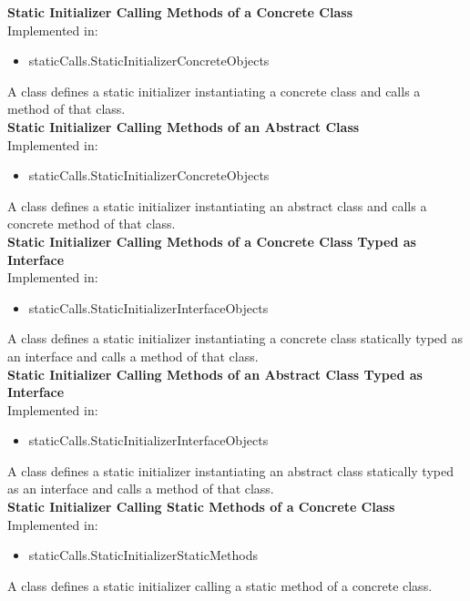 \documentclass{article}
\begin{document}
\noindent
\textbf{Static Initializer Calling Methods of a Concrete Class}\\
Implemented in: 
\begin{itemize}
    \item staticCalls.StaticInitializerConcreteObjects
\end{itemize}
A class defines a static initializer instantiating a concrete class and calls a method of that class.\\

\noindent
\textbf{Static Initializer Calling Methods of an Abstract Class}\\
Implemented in: 
\begin{itemize}
    \item staticCalls.StaticInitializerConcreteObjects
\end{itemize}
A class defines a static initializer instantiating an abstract class and calls a concrete method of that class.\\

\noindent
\textbf{Static Initializer Calling Methods of a Concrete Class Typed as Interface}\\
Implemented in: 
\begin{itemize}
    \item staticCalls.StaticInitializerInterfaceObjects
\end{itemize}
A class defines a static initializer instantiating a concrete class statically typed as an interface and calls a method of that class.\\

\noindent
\textbf{Static Initializer Calling Methods of an Abstract Class Typed as Interface}\\
Implemented in: 
\begin{itemize}
    \item staticCalls.StaticInitializerInterfaceObjects
\end{itemize}
A class defines a static initializer instantiating an abstract class statically typed as an interface and calls a method of that class.\\

\noindent
\textbf{Static Initializer Calling Static Methods of a Concrete Class}\\
Implemented in: 
\begin{itemize}
    \item staticCalls.StaticInitializerStaticMethods
\end{itemize}
A class defines a static initializer calling a static method of a concrete class.\\
\end{document}

